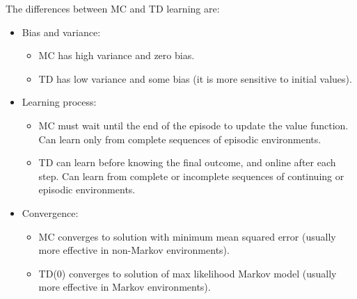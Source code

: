 \documentclass[11pt]{book} %
\begin{document}
The differences between MC and TD learning are: 
\begin{itemize}
    \item Bias and variance:
        \begin{itemize}
            \item MC has high variance and zero bias.
            \item TD has low variance and some bias (it is more sensitive to initial values).
        \end{itemize}
    \item Learning process:
        \begin{itemize}
            \item MC must wait until the end of the episode to update the value function. 
            Can learn only from complete sequences of episodic environments.
            \item TD can learn before knowing the final outcome, and online after each step. 
            Can learn from complete or incomplete sequences of continuing or episodic environments.
        \end{itemize}
    \item Convergence:
        \begin{itemize}
            \item MC converges to solution with minimum mean squared error (usually more effective in non-Markov environments).
            \item TD(0) converges to solution of max likelihood Markov model (usually more effective in Markov environments).
        \end{itemize}
\end{itemize}
\end{document}
